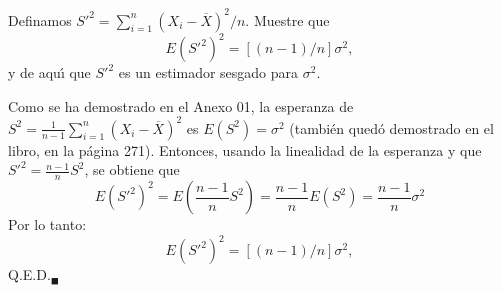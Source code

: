 \begin{enunciado}
 Definamos $S'^2 = \sum_{i=1}^n \left( X_i - \overline{X} \right)^2/n$. Muestre que
 \begin{equation*}
  E \left( S'^2 \right)^2 = \left[ (n-1)/n \right] \sigma^2,
 \end{equation*}
 y de aqu\'{\i} que $S'^2$ es un estimador sesgado para $\sigma^2$.
\end{enunciado}

\begin{solucion}
 Como se ha demostrado en el Anexo 01, la esperanza de $S^2 = \frac{1}{n-1} \sum_{i=1}^n \left( X_i - \overline{X} \right)^2 $ es $E\left( S^2 \right) = \sigma^2$ (tambi\'en qued\'o demostrado en el libro, en la p\'agina 271).
 Entonces, usando la linealidad de la esperanza y que $S'^2 = \frac{n-1}{n} S^2$, 
   se obtiene que
 \begin{equation*}
  E \left( S'^2 \right)^2 = E \left( \frac{n-1}{n} S^2 \right) = \frac{n-1}{n}E\left( S^2 \right) =\frac{n-1}{n}\sigma^2
 \end{equation*}
 Por lo tanto:
 \begin{equation*}
  E \left( S'^2 \right)^2 = \left[ (n-1)/n \right] \sigma^2,
 \end{equation*}
 Q.E.D.${}_{\blacksquare}$
\end{solucion}


